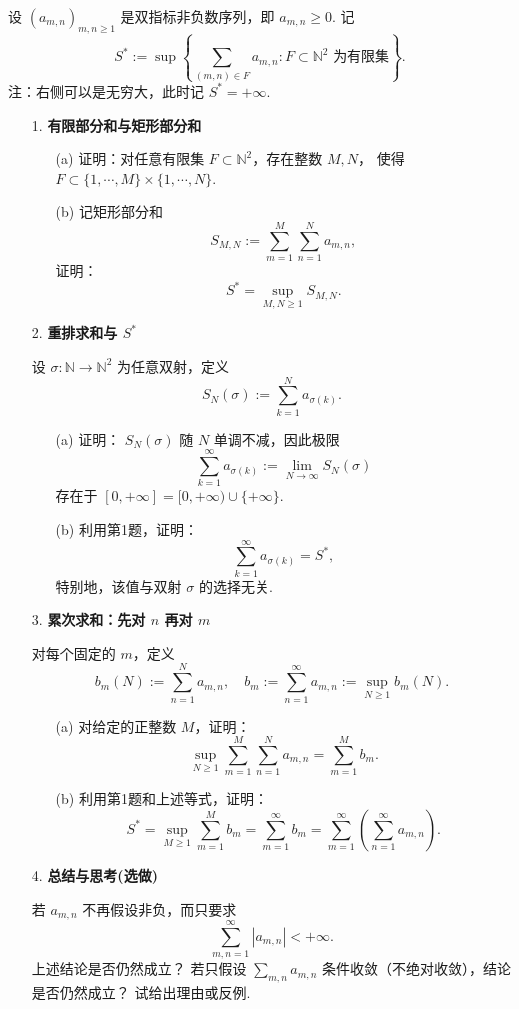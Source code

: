 设 \(\displaystyle(a_{m,n})_{m,n\geq 1}\) 是双指标非负数序列，即 \(\displaystyle a_{m,n} \geq 0\). 记
\[\displaystyle S^* := \sup\left\{\sum_{(m,n)\in F} a_{m,n} : F \subset \mathbb{N}^2 \text{ 为有限集}\right\}.\]
注：右侧可以是无穷大，此时记 \(\displaystyle S^* = +\infty\).

\begin{enumerate}
    \item[1.]\textbf{有限部分和与矩形部分和}
    \begin{enumerate}
        \item[(a)]证明：对任意有限集 \(\displaystyle F \subset \mathbb{N}^2\)，存在整数 \(M, N\)，
        使得\(\displaystyle F \subset \{1, \cdots, M\} \times \{1, \cdots, N\}\).
        \item[(b)]记矩形部分和
        \[\displaystyle S_{M,N} := \sum_{m=1}^M \sum_{n=1}^N a_{m,n},\]
        证明：
        \[\displaystyle S^* = \sup_{M,N\geq 1} S_{M,N}.\]
    \end{enumerate}

    \item[2.]\textbf{重排求和与 \(S^*\)}

    设 \(\displaystyle\sigma : \mathbb{N} \to \mathbb{N}^2\) 为任意双射，定义
    \[\displaystyle S_N(\sigma) := \sum_{k=1}^N a_{\sigma(k)}.\]
    \begin{enumerate}
        \item[(a)]证明： \(\displaystyle S_N(\sigma)\) 随 \(N\) 单调不减，因此极限
        \[\displaystyle \sum_{k=1}^{\infty} a_{\sigma(k)} := \lim_{N\to\infty} S_N(\sigma)\]
        存在于 \(\displaystyle [0, +\infty] = [0, +\infty)\cup \{+\infty\}\).
        \item[(b)]利用第1题，证明：
        \[\displaystyle\sum_{k=1}^{\infty} a_{\sigma(k)} = S^*,\]
        特别地，该值与双射 \(\sigma\) 的选择无关.
    \end{enumerate}

    \item[3.]\textbf{累次求和：先对 \(n\) 再对 \(m\)}

    对每个固定的 \(m\)，定义
    \[\displaystyle b_m(N) := \sum_{n=1}^N a_{m,n},\quad b_m := \sum_{n=1}^{\infty} a_{m,n} := \sup_{N\geq 1} b_m(N).\]
    \begin{enumerate}
        \item[(a)]对给定的正整数 \(M\)，证明：
        \[\displaystyle\sup_{N\geq 1} \sum_{m=1}^M \sum_{n=1}^N a_{m,n} = \sum_{m=1}^M b_m.\]
        \item[(b)]利用第1题和上述等式，证明：
        \[\displaystyle S^* = \sup_{M\geq 1} \sum_{m=1}^M b_m = \sum_{m=1}^{\infty} b_m = \sum_{m=1}^{\infty} \left( \sum_{n=1}^{\infty} a_{m,n} \right).\]
    \end{enumerate}

    \item[4.]\textbf{总结与思考(选做)}

    若 \(a_{m,n}\) 不再假设非负，而只要求
    \[\displaystyle\sum_{m,n=1}^{\infty} |a_{m,n}| < +\infty.\]
    上述结论是否仍然成立？
    若只假设 \(\displaystyle\sum_{m,n} a_{m,n}\) 条件收敛（不绝对收敛），结论是否仍然成立？
    试给出理由或反例.
\end{enumerate}
